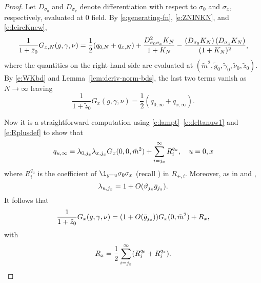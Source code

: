 \begin{proof}
Let $D_{\sigma_0}$ and $D_{\sigma_x}$ denote differentiation with respect to
$\sigma_0$ and $\sigma_x$, respectively, evaluated at $0$ field.
By \eqref{e:generating-fn}, \eqref{e:ZNINKN}, and \eqref{e:IcircKnew},
\begin{equation}
\lbeq{GK}
\frac{1}{1+\tilde z_0} G_{x,N}(g,\gamma,\nu)
	=
\frac{1}{2} (q_{0,N} + q_{x,N})
	+
\frac{D^2_{\sigma_0\sigma_x}K_{N}}{1 + K_{N}}
	-
\frac{\left(D_{\sigma_0}K_{N}\right) \left(D_{\sigma_x}K_{N}\right)}{(1 + K_{N})^2},
\end{equation}
where the quantities on the right-hand side are evaluated at
$(\tilde m^2, \tilde g_0, \tilde\gamma_0, \tilde\nu_0, \tilde z_0)$.
By \eqref{e:WKbd} and Lemma~\ref{lem:deriv-norm-bds}, the last two terms
vanish as $N \to \infty$ leaving
\begin{equation}
\frac{1}{1+\tilde z_0} G_x(g, \gamma, \nu) = \frac{1}{2} (q_{0,\infty} + q_{x,\infty}).
\end{equation}

Now it is a straightforward computation using \eqref{e:lampt}--\eqref{e:deltanuw1}
and \eqref{e:Rplusdef} to show that
\begin{equation}
\label{e:q}
q_{u,\infty}
	=
\lambda_{0, j_x} \lambda_{x, j_x}  G_x(0, 0, \tilde m^2)
	+
\sum_{i = j_x}^\infty R^{q_u}_i,
\quad u = 0, x
\end{equation}
where $R^{q_u}_i$ is the coefficient of $\1_{y=u}\sigma_0\sigma_x$
(recall ) in $R_{+,i}$.
Moreover, as in \cite[\eqref{phi4-e:lam-star}]{ST-phi4} and \cite[Corollary~\ref{phi4-cor:vx}]{ST-phi4},
\begin{equation}
\lambda_{u,j_x} = 1 + O(\vartheta_{j_x} \bar{g}_{j_x}).
\end{equation}
It follows that
\begin{equation}
\frac{1}{1+\tilde z_0} G_x(g, \gamma, \nu)
	=
(1 + O(\bar{g}_{j_x})) G_x(0, \tilde m^2) + R_x,
\end{equation}
with
\begin{equation}
\label{e:Rabdef}
R_x = \frac{1}{2} \sum_{i=j_x}^\infty (R^{q_0}_i + R^{q_x}_i).
\end{equation}


\end{proof}
